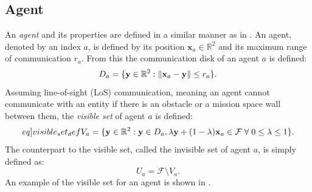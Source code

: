 \subsection{Agent}
An \textit{agent} and its properties are defined in a similar manner as in \cite{sun2014escaping}.
An agent, denoted by an index $a$, is defined by its position $\mathbf{x}_{a}\in\mathbb{R}^{2}$ and 
its maximum range of communication $r_{a}$. From this the communication disk of an agent $a$ is defined:
\begin{equation}
  D_{a} = \{\mathbf{y}\in\mathbb{R}^{2}: \left\lVert\mathbf{x}_{a} - \mathbf{y}\right\rVert\leq r_{a}\}.
\end{equation}
Assuming line-of-sight (LoS) communication, meaning an agent cannot communicate with an entity if there is 
an obstacle or a mission space wall between them, the \textit{visible set} of agent $a$ is defined:
\begin{equation}\label[eq]{visible_set_def}
  V_{a} = \{\mathbf{y}\in\mathbb{R}^{2}:\mathbf{y}\in D_{a}, \lambda\mathbf{y} + (1-\lambda)\mathbf{x}_{a}\in\mathcal{F}\;\forall\;0\leq\lambda\leq 1\}.
\end{equation}
The counterpart to the visible set, called the invisible set of agent $a$, is simply defined as:
\begin{equation}
  U_{a} = \mathcal{F}\setminus V_{a}.
\end{equation}
An example of the visible set for an agent is shown in .

